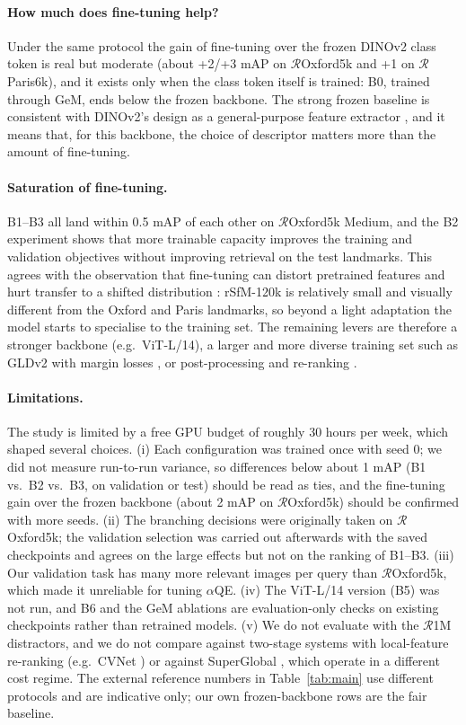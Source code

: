 \documentclass[runningheads]{llncs}
\newcommand{\roxf}{$\mathcal{R}$Oxford5k}
\newcommand{\rpar}{$\mathcal{R}$Paris6k}
\newcommand{\aqe}{$\alpha$QE}
\begin{document}
\paragraph{How much does fine-tuning help?}
Under the same protocol the gain of fine-tuning over the frozen DINOv2 class
token is real but moderate (about +2/+3 mAP on \roxf{} and +1 on \rpar{}),
and it exists only when the class token itself is trained: B0, trained through
GeM, ends below the frozen backbone. The strong frozen baseline is consistent
with DINOv2's design as a general-purpose feature extractor
\cite{oquab2024dinov2}, and it means that, for this backbone, the choice of
descriptor matters more than the amount of fine-tuning.

\paragraph{Saturation of fine-tuning.}
B1--B3 all land within 0.5 mAP of each other on \roxf{} Medium, and the B2
experiment shows that more trainable capacity improves the training and
validation objectives without improving retrieval on the test landmarks. This agrees with the observation that fine-tuning
can distort pretrained features and hurt transfer to a shifted distribution
\cite{kumar2022distort}: rSfM-120k is relatively small and visually different
from the Oxford and Paris landmarks, so beyond a light adaptation the model
starts to specialise to the training set. The remaining levers are therefore a
stronger backbone (e.g.\ ViT-L/14), a larger and more diverse training set such
as GLDv2 \cite{weyand2020gldv2} with margin losses \cite{deng2019arcface}, or
post-processing and re-ranking \cite{iscen2017diffusion,shao2023superglobal}.

\paragraph{Limitations.}
The study is limited by a free GPU budget of roughly 30 hours per week, which
shaped several choices. (i) Each configuration was trained once with seed 0;
we did not measure run-to-run variance, so differences below about 1 mAP
(B1 vs.\ B2 vs.\ B3, on validation or test) should be read as ties, and the
fine-tuning gain over the frozen backbone (about 2 mAP on \roxf{}) should be
confirmed with more seeds. (ii) The branching decisions were originally taken
on \roxf{}; the validation selection was carried out afterwards with the saved
checkpoints and agrees on the large effects but not on the ranking of
B1--B3. (iii) Our validation task has many more relevant images per query
than \roxf{}, which made it unreliable for tuning \aqe{}. (iv) The ViT-L/14
version (B5) was not run, and B6 and the GeM ablations are evaluation-only
checks on existing checkpoints rather than retrained models. (v) We do not
evaluate with the $\mathcal{R}$1M distractors, and we do not compare against
two-stage systems with local-feature re-ranking (e.g.\ CVNet
\cite{lee2022cvnet}) or against SuperGlobal \cite{shao2023superglobal}, which
operate in a different cost regime. The external reference numbers in
Table~\ref{tab:main} use different protocols and are indicative only; our own
frozen-backbone rows are the fair baseline.
\end{document}

